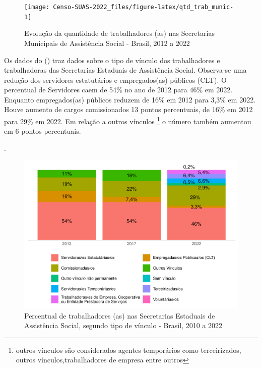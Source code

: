 \documentclass[
  brazilian]{report}
\begin{document}
\begin{figure}
\texttt{[image: Censo-SUAS-2022\_files/figure-latex/qtd\_trab\_munic-1]} \caption[Evolução da quantidade de trabalhadores (as) nas Secretarias Municipais de Assistência Social - Brasil, 2012 a 2022]{Evolução da quantidade de trabalhadores (as) nas Secretarias Municipais de Assistência Social - Brasil, 2012 a 2022}\label{fig:qtd_trab_munic}
\end{figure}

Os dados do () traz dados sobre o tipo de vínculo
dos trabalhadores e trabalhadoras das Secretarias Estaduais de
Assistência Social. Observa-se uma redução dos servidores estatutários e
empregados(as) públicos (CLT). O percentual de Servidores caem de 54\%
no ano de 2012 para 46\% em 2022. Enquanto empregados(as) públicos
reduzem de 16\% em 2012 para 3,3\% em 2022. Houve aumento de cargos
comissionados 13 pontos percentuais, de 16\% em 2012 para 29\% em 2022.
Em relação a outros vínculos
\footnote{outros vínculos são considerados agentes temporários como terceirizados, outros vínculos,trabalhadores de empresa entre outros}
o número também aumentou em 6 pontos percentuais.

.

\begin{figure}
\includegraphics{Censo-SUAS-2022_files/figure-latex/uf_trab_vin-1} \caption[Percentual de trabalhadores (as) nas Secretarias Estaduais de Assistência Social, segundo tipo de vínculo - Brasil, 2010 a 2022]{Percentual de trabalhadores (as) nas Secretarias Estaduais de Assistência Social, segundo tipo de vínculo - Brasil, 2010 a 2022}\label{fig:uf_trab_vin}
\end{figure}
\end{document}
